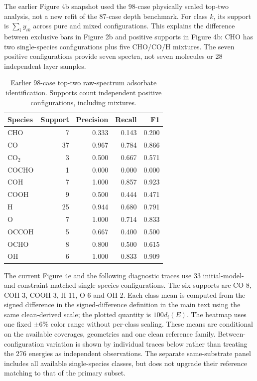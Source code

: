 \documentclass[11pt,a4paper]{article}
\begin{document}
The earlier Figure 4b snapshot used the 98-case physically scaled top-two analysis, not a new refit of the 87-case depth benchmark. For class $k$, its support is $\sum_i y_{ik}$ across pure and mixed configurations. This explains the difference between exclusive bars in Figure 2b and positive supports in Figure 4b: CHO has two single-species configurations plus five CHO/CO/H mixtures. The seven positive configurations provide seven spectra, not seven molecules or 28 independent layer samples.

\begin{table}[!htbp]\centering\small
\caption{Earlier 98-case top-two raw-spectrum adsorbate identification. Supports count independent positive configurations, including mixtures.}
\begin{tabular}{@{}lrrrr@{}}\toprule
Species & Support & Precision & Recall & F1\\\midrule
CHO & 7 & 0.333 & 0.143 & 0.200\\
CO & 37 & 0.967 & 0.784 & 0.866\\
CO$_2$ & 3 & 0.500 & 0.667 & 0.571\\
COCHO & 1 & 0.000 & 0.000 & 0.000\\
COH & 7 & 1.000 & 0.857 & 0.923\\
COOH & 9 & 0.500 & 0.444 & 0.471\\
H & 25 & 0.944 & 0.680 & 0.791\\
O & 7 & 1.000 & 0.714 & 0.833\\
OCCOH & 5 & 0.667 & 0.400 & 0.500\\
OCHO & 8 & 0.800 & 0.500 & 0.615\\
OH & 6 & 1.000 & 0.833 & 0.909\\
\bottomrule\end{tabular}\end{table}

The current Figure 4e and the following diagnostic traces use 33 initial-model-and-constraint-matched single-species configurations. The six supports are CO 8, COH 3, COOH 3, H 11, O 6 and OH 2. Each class mean is computed from the signed difference in the signed-difference definition in the main text using the same clean-derived scale; the plotted quantity is $100d_i(E)$. The heatmap uses one fixed $\pm6\%$ color range without per-class scaling. These means are conditional on the available coverages, geometries and one clean reference family. Between-configuration variation is shown by individual traces below rather than treating the 276 energies as independent observations. The separate same-substrate panel includes all available single-species classes, but does not upgrade their reference matching to that of the primary subset.
\end{document}
